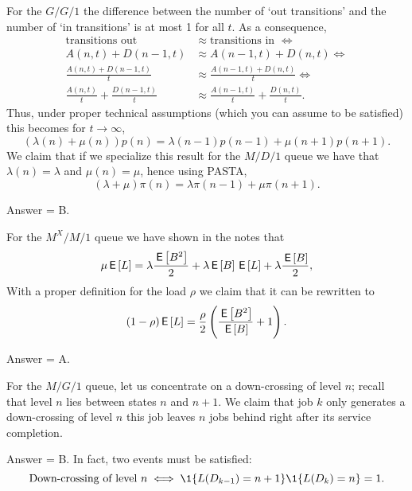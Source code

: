 \begin{exercise}[201807] 
For the $G/G/1$ the difference between the number of `out
 transitions' and the number of `in transitions' is at most 1 for all $t$. As a consequence,
 \begin{align*}
\text{transitions out } &\approx \text{transitions in } \iff \\
 A(n,t) + D(n-1,t) &\approx A(n-1,t) + D(n,t) \iff \\
 \frac{A(n,t) + D(n-1,t)}t &\approx \frac{A(n-1,t) + D(n, t)}t \iff \\
 \frac{A(n,t)}t + \frac{D(n-1,t)}t &\approx \frac{A(n-1,t)}t + \frac{D(n,t)}t.
 \end{align*}
Thus, under proper technical assumptions (which you can assume to be satisfied) this becomes for $t\to\infty$, 
\begin{equation*}
 (\lambda(n) +\mu(n))p(n) = \lambda(n-1)p(n-1) + \mu(n+1)p(n+1).
\end{equation*}
We claim that if we specialize this result for the $M/D/1$ queue we have that
$ \lambda(n) = \lambda$ and $\mu(n) = \mu$, hence using PASTA, 
\begin{equation*}
 (\lambda +\mu)\pi(n) = \lambda\pi(n-1) + \mu\pi(n+1).
\end{equation*}
\begin{solution}
Answer = B.
\end{solution}
\end{exercise}

\begin{exercise}[201807]
For the $M^X/M/1$ queue we have shown in the notes that 
\begin{equation*}
 \mu \,\mathsf{E}\left[L\right] = \lambda \frac{\,\mathsf{E}\left[B^2\right]}2 + \lambda \,\mathsf{E}\left[B\right] \,\mathsf{E}\left[L\right] +\lambda \frac{\,\mathsf{E}\left[B\right]}2,
\end{equation*}
With a proper definition for the load $\rho$ we claim that it can be rewritten to 
\begin{equation*}
(1- \rho) \,\mathsf{E}\left[L\right] = \frac \rho2 \left( \frac{\,\mathsf{E}\left[B^2\right]}{\,\mathsf{E}\left[B\right]} + 1\right).
\end{equation*}
\begin{solution}
Answer = A.
\end{solution}
\end{exercise}


\begin{exercise}[201807]
For the $M/G/1$ queue, let us concentrate on a down-crossing of level $n$; recall that level $n$ lies between states $n$
and $n+1$. We claim that job $k$ only generates a down-crossing of level $n$ this job leaves $n$ jobs behind right after its service completion.
\begin{solution}
Answer = B.
In fact, two events must be satisfied: 
 \begin{equation*}
 \text{Down-crossing of level $n$} \iff \1{L(D_{k-1}) = n+1}\1{L(D_k)=n} = 1.
 \end{equation*}
\end{solution}
\end{exercise}

